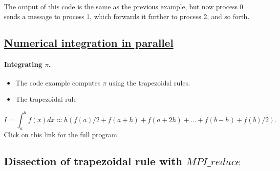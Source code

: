 \documentclass[%
oneside,                 %
final,                   %
10pt]{article}
\begin{document}
The output of this code is the same as the previous example, but now
process 0 sends a message to process 1, which forwards it further
to process 2, and so forth.



\subsection*{\href{{https://github.com/CompPhysics/ComputationalPhysics2/blob/gh-pages/doc/Programs/LecturePrograms/programs/MPI/chapter07/program6.cpp}}{Numerical integration in parallel}}

\paragraph{Integrating $\pi$.}

\begin{itemize}
\item The code example computes $\pi$ using the trapezoidal rules.

\item The trapezoidal rule
\end{itemize}

\noindent
\[
   I=\int_a^bf(x) dx\approx h\left(f(a)/2 + f(a+h) +f(a+2h)+\dots +f(b-h)+ f(b)/2\right).
\]
Click \href{{https://github.com/CompPhysics/ComputationalPhysics2/blob/gh-pages/doc/Programs/LecturePrograms/programs/MPI/chapter07/program6.cpp}}{on this link} for the full program.



\subsection*{Dissection of trapezoidal rule with $MPI\_reduce$}

\paragraph{}
\end{document}

